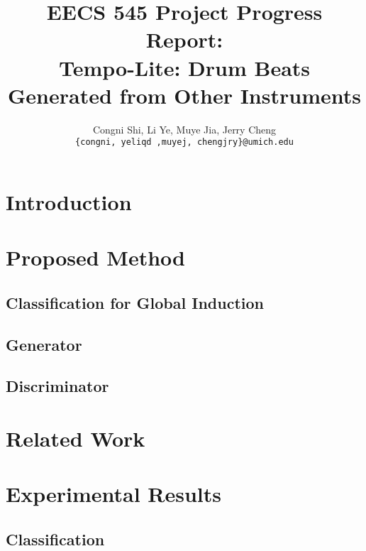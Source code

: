 \documentclass[11pt,letterpaper]{article}
\title{EECS 545 Project Progress Report: \\
        Tempo-Lite: Drum Beats Generated from Other Instruments}
\author{Congni Shi, Li Ye, Muye Jia, Jerry Cheng\\
        \texttt{\{congni, yeliqd ,muyej, chengjry\}@umich.edu}
}
\begin{document}
\maketitle


\section{Introduction}
    \label{sec:introduction}

\section{Proposed Method}
    \label{sec:proposed}

    \subsection{Classification for Global Induction}
        \label{sub:class}

    \subsection{Generator}
    
    \subsection{Discriminator}

\section{Related Work}
    \label{sec:related}

\section{Experimental Results}
    \label{sec:experimental}
    
    \subsection{Classification}
        \label{sub:exp_class}
\end{document}
